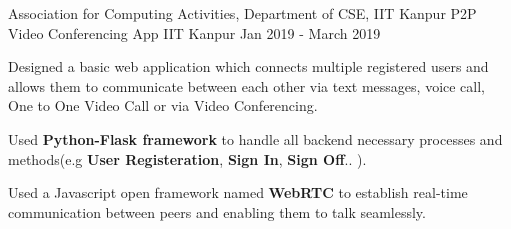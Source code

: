\begin{cventries}
    \cventry
    {Association for Computing Activities, Department of CSE, IIT Kanpur}
    {P2P Video Conferencing App}
    {IIT Kanpur}
    {Jan 2019 - March 2019}
    {
      \begin{cvitems}
        \item {Designed a basic web application which connects multiple registered users and allows them to communicate between each other  via text messages, voice call, One to One Video Call or via Video Conferencing.}
        \item {Used \textbf{Python-Flask framework} to handle all backend necessary processes and methods(e.g \textbf{User Registeration}, \textbf{Sign In}, \textbf{Sign Off}.. ).}
        \item {Used a Javascript open framework named \textbf{WebRTC} to establish real-time communication between peers and enabling them to talk seamlessly.}
      \end{cvitems}
    } 
  
\end{cventries}
